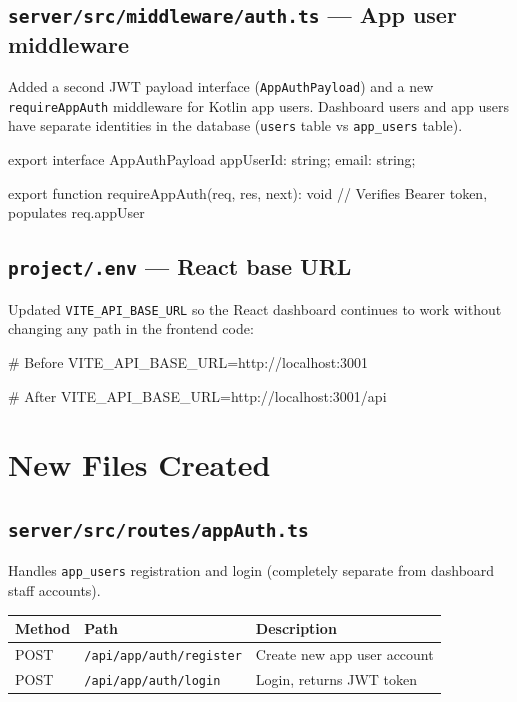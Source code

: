 \documentclass[12pt,a4paper]{report}
\newcommand{\file}[1]{\texttt{\small #1}}
\begin{document}
\subsection{\file{server/src/middleware/auth.ts} — App user middleware}

Added a second JWT payload interface (\texttt{AppAuthPayload}) and a new
\texttt{requireAppAuth} middleware for Kotlin app users.
Dashboard users and app users have separate identities in the database
(\texttt{users} table vs \texttt{app\_users} table).

\begin{greenbox}
export interface AppAuthPayload {
  appUserId: string;
  email:     string;
}

export function requireAppAuth(req, res, next): void {
  // Verifies Bearer token, populates req.appUser
}
\end{greenbox}

\subsection{\file{project/.env} — React base URL}

Updated \texttt{VITE\_API\_BASE\_URL} so the React dashboard continues to work
without changing any path in the frontend code:

\begin{greenbox}
# Before
VITE_API_BASE_URL=http://localhost:3001

# After
VITE_API_BASE_URL=http://localhost:3001/api
\end{greenbox}

\section{New Files Created}

\subsection{\file{server/src/routes/appAuth.ts}}

Handles \texttt{app\_users} registration and login (completely separate from
dashboard staff accounts).

\begin{center}
\begin{tabularx}{0.9\linewidth}{>{\ttfamily\small}l l X}
  \toprule
  \rowcolor{tablehead}\color{white}\textbf{Method} & \color{white}\textbf{Path} & \color{white}\textbf{Description} \\
  \midrule
  POST & \texttt{/api/app/auth/register} & Create new app user account \\
  \rowcolor{rowalt}
  POST & \texttt{/api/app/auth/login}    & Login, returns JWT token \\
  \bottomrule
\end{tabularx}
\end{center}
\end{document}
